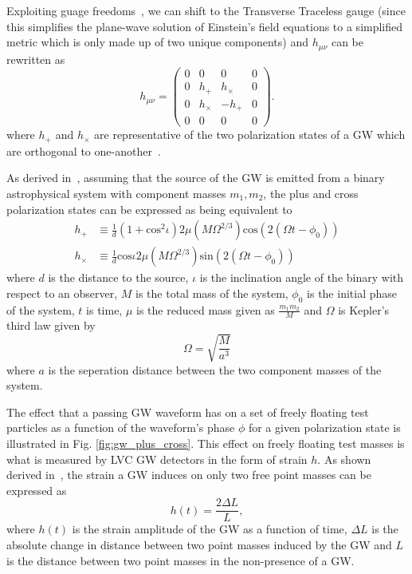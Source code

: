 Exploiting guage freedoms~\cite{carroll_2019}, we 
can shift to the Transverse Traceless 
gauge (since this simplifies the plane-wave solution of Einstein's field 
equations to a simplified metric which is only made up of two 
unique components) 
and $h_{\mu \nu}$ can be rewritten as
%
\begin{equation}
  h_{\mu \nu} =   \begin{pmatrix}
0 & 0 & 0 & 0\\
0 & h_{+} & h_{\times} & 0\\
0 & h_{\times} & -h_{+} & 0\\
0 & 0 & 0 & 0
\end{pmatrix}.
\end{equation}
%
where $h_{+}$ and $h_{\times}$ are representative of the two 
polarization states of a \ac{GW} which are orthogonal to 
one-another~\cite{carroll_2019,Anderson2011}.

%
%
As derived in~\cite{Capano2011SearchingFG}, assuming that the 
source of the \ac{GW} is emitted from 
a binary astrophysical system with component masses $m_1,m_2$, 
the plus and cross polarization states can 
be expressed as being equivalent to
%
\begin{align}
    h_{+} &\equiv \frac{1}{d} (1 + \mathrm{cos}^{2}\iota) 2\mu(M\Omega^{2/3})
    \mathrm{cos}(2(\Omega t - \phi_0))
    \\
    h_{\times} &\equiv \frac{1}{d} \mathrm{cos}\iota 2\mu(M\Omega^{2/3})
    \mathrm{sin}(2(\Omega t - \phi_0))
\end{align}
%
where $d$ is the distance to the source, $\iota$ is the inclination 
angle of the binary with respect to an observer, $M$ is the total 
mass of the system, $\phi_0$ is the initial phase of the system,  
$t$ is time, $\mu$ is the reduced mass given as $\frac{m_1 m_2}{M}$
and $\Omega$ is Kepler's third law given by
%
\begin{equation}
    \Omega = \sqrt{\frac{M}{a^3}}
\end{equation}
%
where $a$ is the seperation distance between the two component 
masses of the system.

The effect that a passing 
\ac{GW} waveform has on a set of freely floating test particles as 
a function of the waveform's phase $\phi$ for a given polarization state is 
illustrated in Fig. \ref{fig:gw_plus_cross}. This effect on freely floating test masses is what is measured by \ac{LVC} \ac{GW} detectors in the 
form of strain $h$. As shown derived in~\cite{Maggiore:2007ulw}, the 
strain a \ac{GW} induces 
on only two free point masses can be expressed as 
%
\begin{equation}
    h(t) = \frac{2 \Delta L}{L},
\end{equation}
%
where $h(t)$ is the strain amplitude of the \ac{GW} 
as a function of time, $\Delta L$ is 
the absolute change in distance between two point masses induced by the \ac{GW}  and $L$ is the distance between two point masses in the non-presence of a 
\ac{GW}.

